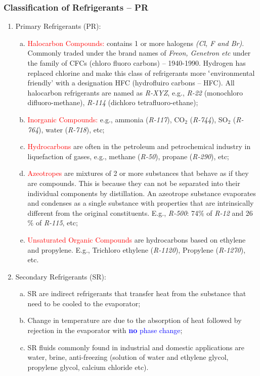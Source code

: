 \documentclass[10pt,compress]{beamer}
\begin{document}
\begin{frame}
 \frametitle{Classification of Refrigerants -- PR}
 \begin{enumerate}[1]\scriptsize
   \item<1-> Primary Refrigerants (PR): 
     \begin{enumerate}[(a)]\scriptsize
       \item<1-> \textcolor{red}{Halocarbon Compounds:} contains 1 or more halogens {\it (Cl, F and Br)}. Commonly traded under the brand names of {\it Freon, Genetron etc} under the family of CFCs (chloro fluoro carbons) -- 1940-1990. Hydrogen has replaced chlorine and make this class of refrigerants more $\lq$environmental friendly' with a designation HFC (hydrofluiro carbons -- HFC). All halocarbon refrigerants are named as {\it R-XYZ}, e.g., {\it R-22} (monochloro difluoro-methane), {\it R-114} (dichloro tetrafluoro-ethane); 
       \item<1-> \textcolor{red}{Inorganic Compounds:} e.g., ammonia ({\it R-117}), CO$_{2}$ ({\it R-744}), SO$_{2}$ ({\it R-764}), water ({\it R-718}), etc;
       \item <1-> \textcolor{red}{Hydrocarbons} are often in the petroleum and petrochemical industry in liquefaction of gases, e.g., methane ({\it R-50}), propane ({\it R-290}), etc;
       \item <1-> \textcolor{red}{Azeotropes} are mixtures of 2 or more substances that behave as if they are compounds. This is because they can not be separated into their individual components by distillation. An azeotrope substance evaporates and condenses as a single substance with properties that are intrinsically different from the original constituents. E.g., {\it R-500}: 74$\%$ of {\it R-12} and 26$\%$ of {\it R-115}, etc;
       \item <1-> \textcolor{red}{Unsaturated Organic Compounds} are hydrocarbons based on ethylene and propylene. E.g., Trichloro ethylene ({\it R-1120}), Propylene ({\it R-1270}), etc.
     \end{enumerate}
   \item<2-> Secondary Refrigerants (SR): 
     \begin{enumerate}[(a)]\scriptsize
       \item <2-> SR are indirect refrigerants that transfer heat from the substance that need to be cooled to the evaporator; 
       \item <2-> Change in temperature are due to the absorption of heat followed by rejection in the evaporator with \textcolor{blue}{{\bf no} phase change};
       \item <2-> SR fluids commonly found in industrial and domestic applications are water, brine, anti-freezing (solution of water and ethylene glycol, propylene glycol, calcium chloride etc).
     \end{enumerate}
 \end{enumerate}
\end{frame}
\end{document}
